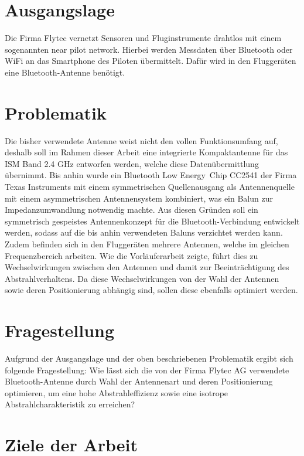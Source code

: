 \section{Ausgangslage}
Die Firma Flytec vernetzt Sensoren und Fluginstrumente drahtlos mit einem sogenannten \glqq near pilot network\grqq. Hierbei werden Messdaten über Bluetooth oder WiFi an das Smartphone des Piloten übermittelt. Dafür wird in den Fluggeräten eine Bluetooth-Antenne benötigt. 

\section{Problematik}
Die bisher verwendete Antenne weist nicht den vollen Funktionsumfang auf, deshalb soll im Rahmen dieser Arbeit eine integrierte Kompaktantenne für das ISM Band 2.4 GHz entworfen werden, welche diese Datenübermittlung übernimmt. Bis anhin wurde ein \glqq Bluetooth Low Energy\grqq \  Chip CC2541 der Firma Texas Instruments mit einem symmetrischen Quellenausgang als Antennenquelle mit einem asymmetrischen  Antennensystem kombiniert, was ein Balun zur Impedanzumwandlung notwendig machte.  Aus diesen Gründen soll ein symmetrisch gespeistes Antennenkonzept für die Bluetooth-Verbindung entwickelt werden, sodass auf die bis anhin verwendeten Baluns verzichtet werden kann. Zudem befinden sich in den Fluggeräten mehrere Antennen, welche im gleichen Frequenzbereich arbeiten. Wie die Vorläuferarbeit zeigte, führt dies zu Wechselwirkungen zwischen den Antennen und damit zur Beeinträchtigung des Abstrahlverhaltens. Da diese Wechselwirkungen von der Wahl der Antennen sowie deren Positionierung abhängig sind, sollen diese ebenfalls optimiert werden. 

\section{Fragestellung}
Aufgrund der Ausgangslage und der oben beschriebenen Problematik ergibt sich folgende Fragestellung: 
Wie lässt sich die von der Firma Flytec AG verwendete Bluetooth-Antenne durch Wahl der Antennenart und deren Positionierung optimieren, um eine hohe Abstrahleffizienz sowie eine isotrope Abstrahlcharakteristik zu erreichen?



\section{Ziele der Arbeit}

